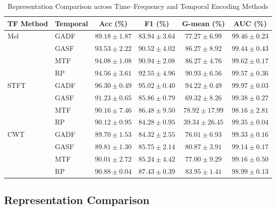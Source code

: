 \documentclass[pdflatex,sn-mathphys-num]{sn-jnl}
\theoremstyle{thmstyleone}%
\theoremstyle{thmstyletwo}%
\theoremstyle{thmstylethree}%
\begin{document}
\begin{table}
    \caption{Representation Comparison across Time--Frequency and Temporal Encoding Methods\label{tab:rep_compare}}
    \centering
    \renewcommand{\arraystretch}{1.15}
    \small
    \begin{tabular}{llcccc}
        \toprule
        \textbf{TF Method} & \textbf{Temporal} & \textbf{Acc (\%)} & \textbf{F1 (\%)} & \textbf{G-mean (\%)} & \textbf{AUC (\%)} \\
        \midrule
        \multirow{4}{*}{Mel} & GADF & $89.18 \pm 1.87$ & $83.94 \pm 3.64$ & $77.27 \pm 6.99$ & $99.46 \pm 0.23$ \\
         & GASF & $93.53 \pm 2.22$ & $90.52 \pm 4.02$ & $86.27 \pm 8.92$ & $99.44 \pm 0.43$ \\
         & MTF & $94.08 \pm 1.08$ & $90.94 \pm 2.08$ & $86.27 \pm 4.76$ & $99.62 \pm 0.17$ \\
         & RP & $94.56 \pm 3.61$ & $92.55 \pm 4.96$ & $90.93 \pm 6.56$ & $99.57 \pm 0.36$ \\
        \cmidrule(lr){2-6}
        \multirow{4}{*}{STFT} & GADF & $\mathbf{96.30 \pm 0.49}$ & $\mathbf{95.02 \pm 0.40}$ & $\mathbf{94.22 \pm 0.49}$ & $\mathbf{99.97 \pm 0.03}$ \\
         & GASF & $91.23 \pm 0.65$ & $85.86 \pm 0.79$ & $69.32 \pm 8.26$ & $99.38 \pm 0.27$ \\
         & MTF & $90.16 \pm 7.46$ & $86.48 \pm 9.50$ & $78.92 \pm 17.99$ & $98.16 \pm 2.81$ \\
         & RP & $90.12 \pm 0.95$ & $84.28 \pm 0.95$ & $39.34 \pm 26.45$ & $99.35 \pm 0.04$ \\
        \cmidrule(lr){2-6}
        \multirow{4}{*}{CWT} & GADF & $89.70 \pm 1.53$ & $84.32 \pm 2.55$ & $76.01 \pm 6.93$ & $99.33 \pm 0.16$ \\
         & GASF & $89.81 \pm 1.30$ & $85.75 \pm 2.14$ & $80.87 \pm 3.91$ & $99.14 \pm 0.17$ \\
         & MTF & $90.01 \pm 2.72$ & $85.24 \pm 4.42$ & $77.00 \pm 9.29$ & $99.16 \pm 0.50$ \\
         & RP & $90.88 \pm 0.04$ & $87.43 \pm 0.39$ & $83.95 \pm 1.41$ & $98.99 \pm 0.13$ \\
        \bottomrule
    \end{tabular}
\end{table}

\subsection{Representation Comparison}
\label{sec:rep_compare}
\end{document}
